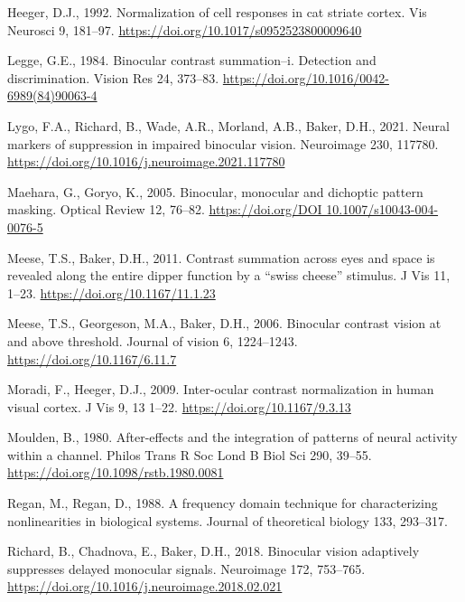 \documentclass[
  12pt,
]{article}
\newlength{\cslhangindent}
\newenvironment{CSLReferences}[2] %
 {\begin{list}{}{%
  \setlength{\itemindent}{0pt}
  \setlength{\leftmargin}{0pt}
  \setlength{\parsep}{0pt}
  \ifodd #1
   \setlength{\leftmargin}{\cslhangindent}
   \setlength{\itemindent}{-1\cslhangindent}
  \fi
  \setlength{\itemsep}{#2\baselineskip}}}
 {\end{list}}
\begin{document}
\begin{CSLReferences}{1}{0}
Heeger, D.J., 1992. Normalization of cell responses in cat striate
cortex. Vis Neurosci 9, 181--97.
\url{https://doi.org/10.1017/s0952523800009640}

Legge, G.E., 1984. Binocular contrast summation--i. Detection and
discrimination. Vision Res 24, 373--83.
\url{https://doi.org/10.1016/0042-6989(84)90063-4}

Lygo, F.A., Richard, B., Wade, A.R., Morland, A.B., Baker, D.H., 2021.
Neural markers of suppression in impaired binocular vision. Neuroimage
230, 117780. \url{https://doi.org/10.1016/j.neuroimage.2021.117780}

Maehara, G., Goryo, K., 2005. Binocular, monocular and dichoptic pattern
masking. Optical Review 12, 76--82.
\href{https://doi.org/DOI\%2010.1007/s10043-004-0076-5}{https://doi.org/DOI
10.1007/s10043-004-0076-5}

Meese, T.S., Baker, D.H., 2011. Contrast summation across eyes and space
is revealed along the entire dipper function by a {``swiss cheese''}
stimulus. J Vis 11, 1--23. \url{https://doi.org/10.1167/11.1.23}

Meese, T.S., Georgeson, M.A., Baker, D.H., 2006. Binocular contrast
vision at and above threshold. Journal of vision 6, 1224--1243.
\url{https://doi.org/10.1167/6.11.7}

Moradi, F., Heeger, D.J., 2009. Inter-ocular contrast normalization in
human visual cortex. J Vis 9, 13 1--22.
\url{https://doi.org/10.1167/9.3.13}

Moulden, B., 1980. After-effects and the integration of patterns of
neural activity within a channel. Philos Trans R Soc Lond B Biol Sci
290, 39--55. \url{https://doi.org/10.1098/rstb.1980.0081}

Regan, M., Regan, D., 1988. A frequency domain technique for
characterizing nonlinearities in biological systems. Journal of
theoretical biology 133, 293--317.

Richard, B., Chadnova, E., Baker, D.H., 2018. Binocular vision
adaptively suppresses delayed monocular signals. Neuroimage 172,
753--765. \url{https://doi.org/10.1016/j.neuroimage.2018.02.021}


\end{CSLReferences}
\end{document}
